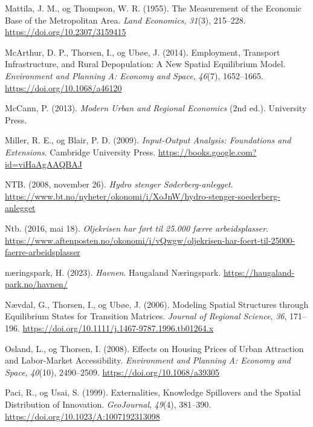 \documentclass[
]{article}
\newlength{\cslhangindent}
\newlength{\cslentryspacingunit} %
\newenvironment{CSLReferences}[2] %
 {%
  \setlength{\parindent}{0pt}
  \ifodd #1
  \let\oldpar\par
  \def\par{\hangindent=\cslhangindent\oldpar}
  \fi
  \setlength{\parskip}{#2\cslentryspacingunit}
 }%
 {}
\begin{document}
\begin{CSLReferences}{1}{0}
\leavevmode{}%
Mattila, J. M., og Thompson, W. R. (1955). The {Measurement} of the
{Economic Base} of the {Metropolitan Area}. \emph{Land Economics},
\emph{31}(3), 215--228. \url{https://doi.org/10.2307/3159415}

\leavevmode{}%
McArthur, D. P., Thorsen, I., og Ubøe, J. (2014). Employment, {Transport
Infrastructure}, and {Rural Depopulation}: {A New Spatial Equilibrium
Model}. \emph{Environment and Planning A: Economy and Space},
\emph{46}(7), 1652--1665. \url{https://doi.org/10.1068/a46120}

\leavevmode{}%
McCann, P. (2013). \emph{Modern Urban and Regional Economics} (2nd ed.).
{University Press}.

\leavevmode{}%
Miller, R. E., og Blair, P. D. (2009). \emph{Input-{Output Analysis}:
{Foundations} and {Extensions}}. {Cambridge University Press}.
\url{https://books.google.com?id=viHaAgAAQBAJ}

\leavevmode{}%
NTB. (2008, november 26). \emph{Hydro stenger Søderberg-anlegget}.
\url{https://www.bt.no/nyheter/okonomi/i/XoJnW/hydro-stenger-soederberg-anlegget}

\leavevmode{}%
Ntb. (2016, mai 18). \emph{Oljekrisen har ført til 25.000 færre
arbeidsplasser}.
\url{https://www.aftenposten.no/okonomi/i/vQwgw/oljekrisen-har-foert-til-25000-faerre-arbeidsplasser}

\leavevmode{}%
næringspark, H. (2023). \emph{Havnen}. {Haugaland Næringspark}.
\url{https://haugaland-park.no/havnen/}

\leavevmode{}%
Nævdal, G., Thorsen, I., og Ubøe, J. (2006). Modeling Spatial Structures
through Equilibrium States for Transition Matrices. \emph{Journal of
Regional Science}, \emph{36}, 171--196.
\url{https://doi.org/10.1111/j.1467-9787.1996.tb01264.x}

\leavevmode{}%
Osland, L., og Thorsen, I. (2008). Effects on {Housing Prices} of {Urban
Attraction} and {Labor-Market Accessibility}. \emph{Environment and
Planning A: Economy and Space}, \emph{40}(10), 2490--2509.
\url{https://doi.org/10.1068/a39305}

\leavevmode{}%
Paci, R., og Usai, S. (1999). Externalities, Knowledge Spillovers and
the Spatial Distribution of Innovation. \emph{GeoJournal}, \emph{49}(4),
381--390. \url{https://doi.org/10.1023/A:1007192313098}


\end{CSLReferences}
\end{document}
